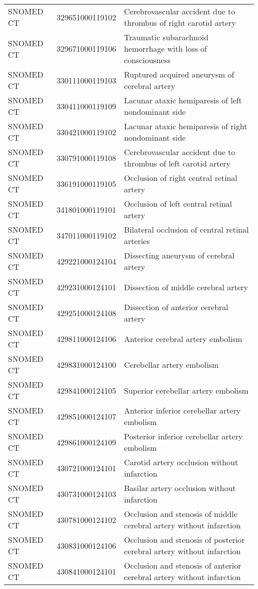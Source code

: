 \begin{longtable}{p{}p{}p{}}
  SNOMED CT & 329651000119102 & Cerebrovascular accident due to thrombus of right carotid artery \\ 
  SNOMED CT & 329671000119106 & Traumatic subarachnoid hemorrhage with loss of consciousness \\ 
  SNOMED CT & 330111000119103 & Ruptured acquired aneurysm of cerebral artery \\ 
  SNOMED CT & 330411000119109 & Lacunar ataxic hemiparesis of left nondominant side \\ 
  SNOMED CT & 330421000119102 & Lacunar ataxic hemiparesis of right nondominant side \\ 
  SNOMED CT & 330791000119108 & Cerebrovascular accident due to thrombus of left carotid artery \\ 
  SNOMED CT & 336191000119105 & Occlusion of right central retinal artery \\ 
  SNOMED CT & 341801000119101 & Occlusion of left central retinal artery \\ 
  SNOMED CT & 347011000119102 & Bilateral occlusion of central retinal arteries \\ 
  SNOMED CT & 429221000124104 & Dissecting aneurysm of cerebral artery \\ 
  SNOMED CT & 429231000124101 & Dissection of middle cerebral artery \\ 
  SNOMED CT & 429251000124108 & Dissection of anterior cerebral artery \\ 
  SNOMED CT & 429811000124106 & Anterior cerebral artery embolism \\ 
  SNOMED CT & 429831000124100 & Cerebellar artery embolism \\ 
  SNOMED CT & 429841000124105 & Superior cerebellar artery embolism \\ 
  SNOMED CT & 429851000124107 & Anterior inferior cerebellar artery embolism \\ 
  SNOMED CT & 429861000124109 & Posterior inferior cerebellar artery embolism \\ 
  SNOMED CT & 430721000124101 & Carotid artery occlusion without infarction \\ 
  SNOMED CT & 430731000124103 & Basilar artery occlusion without infarction \\ 
  SNOMED CT & 430781000124102 & Occlusion and stenosis of middle cerebral artery without infarction \\ 
  SNOMED CT & 430831000124106 & Occlusion and stenosis of posterior cerebral artery without infarction \\ 
  SNOMED CT & 430841000124101 & Occlusion and stenosis of anterior cerebral artery without infarction \\ 

\end{longtable}
